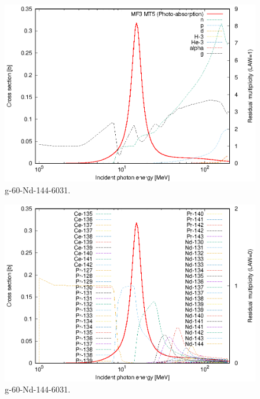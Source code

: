\begin{figure}
 \includegraphics[width=\linewidth]{eps/g_60-Nd-144_6031.eps}
  \caption{g-60-Nd-144-6031.}
\end{figure}
\begin{figure}
 \includegraphics[width=\linewidth]{eps-law0/g_60-Nd-144_6031.eps}
 \caption{g-60-Nd-144-6031.}
\end{figure}
\newpage \clearpage

